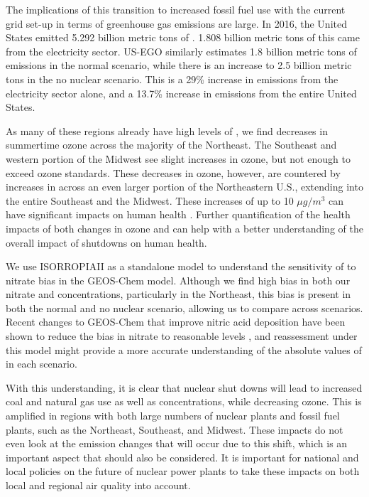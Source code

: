 \documentclass[12]{article}
\begin{document}
The implications of this transition to increased fossil fuel use with the current grid set-up in terms of greenhouse gas emissions are large. In 2016, the United States emitted 5.292 billion metric tons \citep{us_epa_inventory_2020} of . 1.808 billion metric tons of this came from the electricity sector. US-EGO similarly estimates 1.8 billion metric tons of  emissions in the normal scenario, while there is an increase to 2.5 billion metric tons in the no nuclear scenario. This is a 29\% increase in emissions from the electricity sector alone, and a 13.7\% increase in emissions from the entire United States.

As many of these regions already have high levels of , we find decreases in summertime ozone across the majority of the Northeast. The Southeast and western portion of the Midwest see slight increases in ozone, but not enough to exceed ozone standards. These decreases in ozone, however, are countered by increases in  across an even larger portion of the Northeastern U.S., extending into the entire Southeast and the Midwest. These increases of up to 10 $\mu g/m^3$ can have significant impacts on human health \citep{burnett_global_2018}. Further quantification of the health impacts of both changes in ozone and  can help with a better understanding of the overall impact of shutdowns on human health. 

We use ISORROPIAII as a standalone model to understand the sensitivity of  to nitrate bias in the GEOS-Chem model. Although we find high bias in both our nitrate and  concentrations, particularly in the Northeast, this bias is present in both the normal and no nuclear scenario, allowing us to compare across scenarios. Recent changes to GEOS-Chem that improve nitric acid deposition have been shown to reduce the bias in nitrate to reasonable levels \citep{luo_revised_2019}, and reassessment under this model might provide a more accurate understanding of the absolute values of  in each scenario.

With this understanding, it is clear that nuclear shut downs will lead to increased coal and natural gas use as well as  concentrations, while decreasing ozone. This is amplified in regions with both large numbers of nuclear plants and fossil fuel plants, such as the Northeast, Southeast, and Midwest. These impacts do not even look at the  emission changes that will occur due to this shift, which is an important aspect that should also be considered. It is important for national and local policies on the future of nuclear power plants to take these impacts on both local and regional air quality into account.
\end{document}
